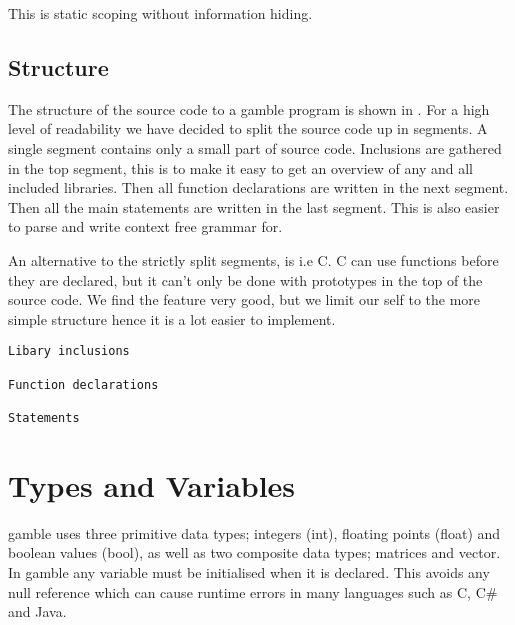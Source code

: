This is static scoping without information hiding. 

\subsection*{Structure} 
The structure of the source code to a \gls{gamble} program is shown in .
For a high level of readability we have decided  to split the source code up in segments.
A single segment contains only a small part of source code.
Inclusions are gathered in the top segment, this is to make it easy to get an overview of any and all included libraries. 
Then all function declarations are written in the next segment.
Then all the main statements are written in the last segment. 
This is also easier to parse and write context free grammar for.

An alternative to the strictly split segments, is i.e C.
C can use functions before they are declared, but it can't only be done with prototypes in the top of the source code.
We find the feature very good, but we limit our self to the more simple structure hence it is a lot easier to implement.

\begin{lstlisting}[caption={Source code file layout in \gls{gamble}},frame=tlrb,label={lst:Structure}, numbers=none]
Libary inclusions

Function declarations

Statements
\end{lstlisting}

\section{Types and Variables} \label{sec:Types}
\gls{gamble} uses three primitive data types; integers (int), floating points (float) and boolean values (bool), as well as two composite data types; matrices and vector. 
In \gls{gamble} any variable must be initialised when it is declared. 
This avoids any null reference which can cause runtime errors in many languages such as C, C\# and Java. 

